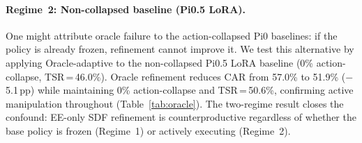 \paragraph{Regime~2: Non-collapsed baseline (Pi0.5 LoRA).}
One might attribute oracle failure to the action-collapsed Pi0 baselines: if the policy is already frozen, refinement cannot improve it. We test this alternative by applying Oracle-adaptive to the non-collapsed Pi0.5 LoRA baseline (0\% action-collapse, TSR\,=\,46.0\%). Oracle refinement reduces CAR from 57.0\% to 51.9\% ($-$5.1\,pp) while maintaining 0\% action-collapse and TSR\,=\,50.6\%, confirming active manipulation throughout (Table~\ref{tab:oracle}). The two-regime result closes the confound: EE-only SDF refinement is counterproductive regardless of whether the base policy is frozen (Regime~1) or actively executing (Regime~2).
